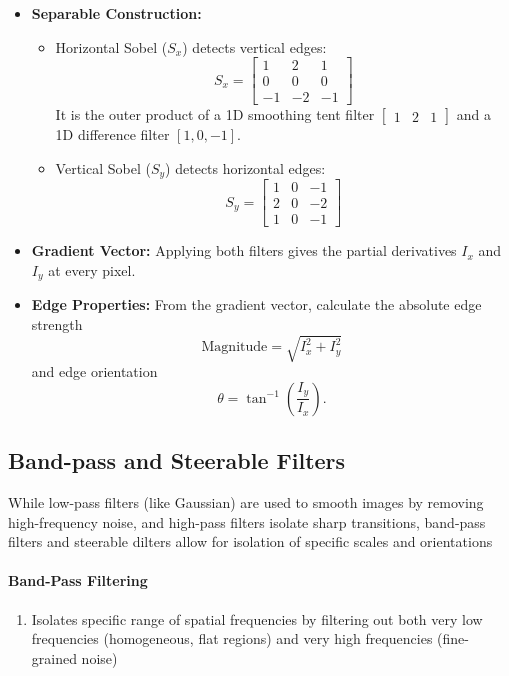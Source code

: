 \documentclass[12pt]{article}
\begin{document}
\begin{itemize}
    \item \textbf{Separable Construction:}
          \begin{itemize}
              \item Horizontal Sobel ($S_x$) detects vertical edges:
                    \[
                        S_x = \begin{bmatrix} 1 & 2 & 1 \\ 0 & 0 & 0 \\ -1 & -2 & -1 \end{bmatrix}
                    \]
                    It is the outer product of a 1D smoothing tent filter $\begin{bmatrix} 1 & 2 & 1 \end{bmatrix}$ and a 1D difference filter $[1,0,-1]$.

              \item Vertical Sobel ($S_y$) detects horizontal edges:
                    \[
                        S_y = \begin{bmatrix} 1 & 0 & -1 \\ 2 & 0 & -2 \\ 1 & 0 & -1 \end{bmatrix}
                    \]
          \end{itemize}
    \item \textbf{Gradient Vector:} Applying both filters gives the partial derivatives $I_x$ and $I_y$ at every pixel.
    \item \textbf{Edge Properties:} From the gradient vector, calculate the absolute edge strength
          \[
              \text{Magnitude} = \sqrt{I_x^2 + I_y^2}
          \]
          and edge orientation
          \[
              \theta = \tan^{-1}\left(\frac{I_y}{I_x}\right).
          \]
\end{itemize}

\subsection{Band-pass and Steerable Filters}

While low-pass filters (like Gaussian) are used to smooth images by removing high-frequency noise, and high-pass filters isolate sharp transitions, band-pass filters and steerable dilters allow for isolation of specific scales and orientations

\paragraph{Band-Pass Filtering}
\begin{enumerate}
    \item Isolates specific range of spatial frequencies by filtering out both very low frequencies (homogeneous, flat regions) and very high frequencies (fine-grained noise)
\end{enumerate}
\end{document}
